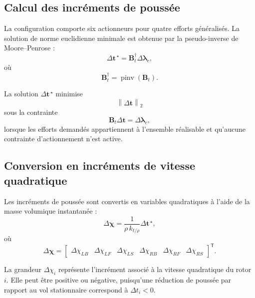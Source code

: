 \documentclass[11pt,a4paper,oneside]{report}
\newcommand{\vect}[1]{\bm{#1}}
\newcommand{\trans}{^{\mathsf T}}
\newcommand{\norm}[1]{\left\lVert#1\right\rVert}
\begin{document}
\subsection{Calcul des incréments de poussée}

La configuration comporte six actionneurs pour quatre efforts généralisés. La solution de norme euclidienne minimale est obtenue par la pseudo-inverse de Moore--Penrose :
\begin{equation}
	\Delta\vect t^{\,\star}
	=
	\mathbf B_t^\dagger
	\Delta\vect\lambda_c,
	\label{eq_incremental_thrust_allocation_pseudoinverse}
\end{equation}
où
\begin{equation}
	\mathbf B_t^\dagger
	=
	\operatorname{pinv}\!\left(\mathbf B_t\right).
	\label{eq_thrust_allocation_pseudoinverse}
\end{equation}

La solution $\Delta\vect t^{\,\star}$ minimise
\begin{equation}
	\norm{\Delta\vect t}_2
\end{equation}
sous la contrainte
\begin{equation}
	\mathbf B_t\Delta\vect t
	=
	\Delta\vect\lambda_c,
\end{equation}
lorsque les efforts demandés appartiennent à l'ensemble réalisable et qu'aucune contrainte d'actionnement n'est active.

\subsection{Conversion en incréments de vitesse quadratique}

Les incréments de poussée sont convertis en variables quadratiques à l'aide de la masse volumique instantanée :
\begin{equation}
	\Delta\vect\chi
	=
	\frac{1}
	{\rho\,k_{t/\rho}}
	\Delta\vect t^{\,\star},
	\label{eq_incremental_squared_speed_command}
\end{equation}
où
\begin{equation}
	\Delta\vect\chi
	=
	\begin{bmatrix}
		\Delta\chi_{LB} &
		\Delta\chi_{LF} &
		\Delta\chi_{LS} &
		\Delta\chi_{RB} &
		\Delta\chi_{RF} &
		\Delta\chi_{RS}
	\end{bmatrix}\trans.
\end{equation}

La grandeur $\Delta\chi_i$ représente l'incrément associé à la vitesse quadratique du rotor $i$. Elle peut être positive ou négative, puisqu'une réduction de poussée par rapport au vol stationnaire correspond à $\Delta t_i<0$.
\end{document}
